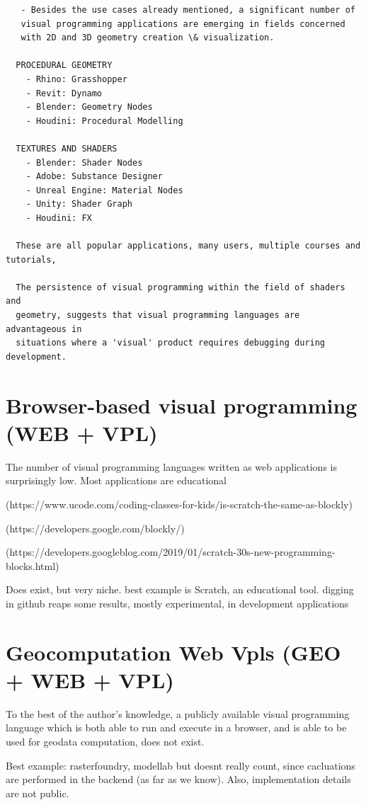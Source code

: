 \begin{lstlisting} 
   - Besides the use cases already mentioned, a significant number of 
   visual programming applications are emerging in fields concerned 
   with 2D and 3D geometry creation \& visualization. 

  PROCEDURAL GEOMETRY 
    - Rhino: Grasshopper
    - Revit: Dynamo  
    - Blender: Geometry Nodes
    - Houdini: Procedural Modelling
  
  TEXTURES AND SHADERS
    - Blender: Shader Nodes
    - Adobe: Substance Designer
    - Unreal Engine: Material Nodes
    - Unity: Shader Graph
    - Houdini: FX

  These are all popular applications, many users, multiple courses and tutorials, 

  The persistence of visual programming within the field of shaders and
  geometry, suggests that visual programming languages are advantageous in
  situations where a 'visual' product requires debugging during development. 
\end{lstlisting}

\section{Browser-based visual programming (WEB + VPL)}
\label{sec:related-webvpl}

The number of visual programming languages written as web applications is surprisingly low. 
Most applications are educational


(https://www.ucode.com/coding-classes-for-kids/is-scratch-the-same-as-blockly)

(https://developers.google.com/blockly/)

(https://developers.googleblog.com/2019/01/scratch-30s-new-programming-blocks.html)


Does exist, but very niche. 
best example is Scratch, an educational tool.
digging in github reaps some results, mostly experimental, in development applications

\section{Geocomputation Web Vpls (GEO + WEB + VPL)} 
To the best of the author's knowledge, a publicly available visual programming language which is both able to run and execute in a browser, and is able to be used for geodata computation, does not exist. 

Best example: rasterfoundry, modellab but doesnt really count, since cacluations are performed in the backend (as far as we know). 
Also, implementation details are not public. 


